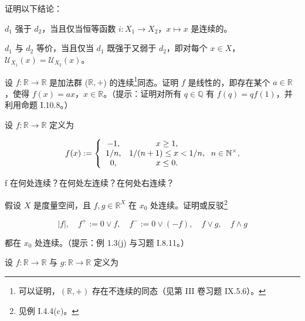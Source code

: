 \begin{exercises}
证明以下结论：

\begin{items}
\item

$ d_1 $ 强于 $ d_2 $，当且仅当恒等函数 $ i: X_1 \to X_2 $，$ x \mapsto x $ 是连续的。

\item

$ d_1 $ 与 $ d_2 $ 等价，当且仅当 $ d_1 $ 既强于又弱于 $ d_2 $，即对每个 $ x \in X $，$ \mathcal{U}_{X_1}(x) = \mathcal{U}_{X_2}(x) $。

\end{items}

\item

设 $ f: \mathbb{R} \to \mathbb{R} $ 是加法群 ($ \mathbb{R},+ $) 的连续\footnote{可以证明，$ (\mathbb{R}, +) $ 存在不连续的同态（见第 III 卷习题 IX.5.6）。}同态。证明 $ f $ 是线性的，即存在某个 $ a \in \mathbb{R} $，使得 $ f(x) = ax $，$ x \in \mathbb{R} $。（提示：证明对所有 $ q \in \mathbb{Q} $ 有 $ f(q) = qf(1) $，并利用命题 I.10.8。）

\item

设 $ f: \mathbb{R} \to \mathbb{R} $ 定义为

\begin{equation*}
f(x):=\left\{\begin{array}{c c}{-1,}&{x\geq1,}\\ {1/n,}&{1/(n+1)\leq x<1/n,}\\ {0,}&{x\leq0.}\\ \end{array}\right.n\in\mathbb{N}^{\times},
\end{equation*}

f 在何处连续？在何处左连续？在何处右连续？

\item

假设 $X$ 是度量空间，且 $f, g \in \mathbb{R}^X$ 在 $x_0$ 处连续。证明或反驳\footnote{见例 I.4.4(c)。}

\begin{equation}
|f|,\quad f^{+}:=0\lor f,\quad f^{-}:=0\lor\left(-f\right),\quad f\lor g,\quad f\land g
\end{equation}

都在 $ x_{0} $ 处连续。（提示：例 1.3(j) 与习题 I.8.11。）

\item

设 $ f: \mathbb{R} \to \mathbb{R} $ 与 $ g: \mathbb{R} \to \mathbb{R} $ 定义为


\end{exercises}
